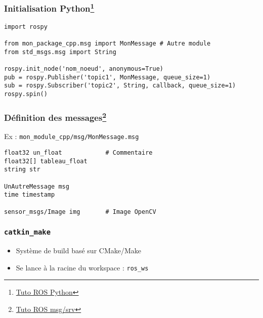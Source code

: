 \documentclass{beamer}
\begin{document}
\begin{frame}[fragile]
\frametitle{Initialisation Python\footnote{\href{http://wiki.ros.org/ROS/Tutorials/WritingPublisherSubscriber\%28python\%29
}{Tuto ROS Python}}}

\begin{verbatim}
import rospy

from mon_package_cpp.msg import MonMessage # Autre module
from std_msgs.msg import String

rospy.init_node('nom_noeud', anonymous=True)
pub = rospy.Publisher('topic1', MonMessage, queue_size=1)
sub = rospy.Subscriber('topic2', String, callback, queue_size=1)
rospy.spin()
\end{verbatim}
\end{frame}
    
\begin{frame}[fragile]
\frametitle{Définition des messages\footnote{\href{http://wiki.ros.org/ROS/Tutorials/CreatingMsgAndSrv
}{Tuto ROS msg/srv}}}
Ex : \texttt{mon\_module\_cpp/msg/MonMessage.msg}

\begin{verbatim}
float32 un_float            # Commentaire
float32[] tableau_float
string str

UnAutreMessage msg
time timestamp

sensor_msgs/Image img       # Image OpenCV
\end{verbatim}

\end{frame}


\begin{frame}
\frametitle{\texttt{catkin\_make}}
\begin{itemize}
    \item Système de build basé sur CMake/Make
    \item Se lance à la racine du workspace : \texttt{ros\_ws}
\end{itemize}
\end{frame}
\end{document}
